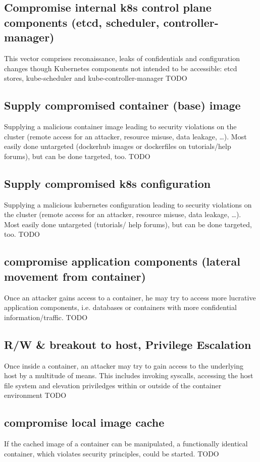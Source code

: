 \subsection{Compromise internal k8s control plane components (etcd, scheduler, controller-manager)}
This vector comprises reconaissance, leaks of confidentials and configuration changes though Kubernetes components not intended to be accessible: etcd stores, kube-scheduler and kube-controller-manager
TODO

\subsection{Supply compromised container (base) image}
Supplying a malicious container image leading to security violations on the cluster (remote access for an attacker, resource misuse, data leakage, …). Most easily done untargeted (dockerhub images or dockerfiles on tutorials/help forums), but can be done targeted, too.
TODO

\subsection{Supply compromised k8s configuration}
Supplying a malicious kubernetes configuration leading to security violations on the cluster (remote access for an attacker, resource misuse, data leakage, …). Most easily done untargeted (tutorials/ help forums), but can be done targeted, too.
TODO

\subsection{compromise application components (lateral movement from container)}
Once an attacker gains access to a container, he may try to access more lucrative application components, i.e. databases or containers with more confidential information/traffic.
TODO

\subsection{R/W \& breakout to host, Privilege Escalation}
Once inside a container, an attacker may try to gain access to the underlying host by a multitude of means. This includes invoking syscalls, accessing the host file system and elevation priviledges within or outside of the container environment
TODO

\subsection{compromise local image cache}
If the cached image of a container can be manipulated, a functionally identical container, which violates security principles, could be started.
TODO

